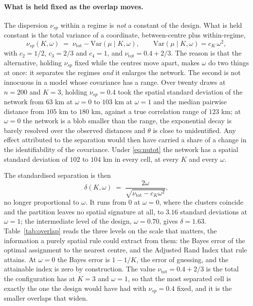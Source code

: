 \paragraph{What is held fixed as the overlap moves.} The dispersion $\nu_{sp}$ within a regime is \emph{not} a constant of the design. What is held constant is the total variance of a coordinate, between-centre plus within-regime,
\begin{equation}
  \nu_{sp}(K,\omega) \;=\; \nu_{\mathrm{tot}} - \mathrm{Var}(\mu \mid K, \omega),
  \qquad
  \mathrm{Var}(\mu \mid K, \omega) = c_K\,\omega^2 ,
  \label{eq:nutot}
\end{equation}
with $c_2 = 1/2$, $c_3 = 2/3$ and $c_4 = 1$, and $\nu_{\mathrm{tot}} = 0.4 + 2/3$. The reason is that the alternative, holding $\nu_{sp}$ fixed while the centres move apart, makes $\omega$ do two things at once: it separates the regimes \emph{and} it enlarges the network. The second is not innocuous in a model whose covariance has a range. Over twenty draws at $n=200$ and $K=3$, holding $\nu_{sp}=0.4$ took the spatial standard deviation of the network from $63$ km at $\omega=0$ to $103$ km at $\omega=1$ and the median pairwise distance from $105$ km to $180$ km, against a true correlation range of $123$ km; at $\omega=0$ the network is a blob smaller than the range, the exponential decay is barely resolved over the observed distances and $\theta$ is close to unidentified. Any effect attributed to the separation would then have carried a share of a change in the identifiability of the covariance. Under \eqref{eq:nutot} the network has a spatial standard deviation of $102$ to $104$ km in every cell, at every $K$ and every $\omega$.

The standardised separation is then
\begin{equation}
  \delta(K,\omega) \;=\; \frac{2\omega}{\sqrt{\nu_{\mathrm{tot}} - c_K \omega^2}} ,
  \label{eq:sep}
\end{equation}
no longer proportional to $\omega$. It runs from $0$ at $\omega=0$, where the clusters coincide and the partition leaves no spatial signature at all, to $3.16$ standard deviations at $\omega=1$; the intermediate level of the design, $\omega = 0.70$, gives $\delta = 1.63$. Table~\ref{tab:overlap} reads the three levels on the scale that matters, the information a purely spatial rule could extract from them: the Bayes error of the optimal assignment to the nearest centre, and the Adjusted Rand Index that rule attains. At $\omega = 0$ the Bayes error is $1 - 1/K$, the error of guessing, and the attainable index is zero by construction. The value $\nu_{\mathrm{tot}} = 0.4 + 2/3$ is the total the configuration has at $K=3$ and $\omega=1$, so that the most separated cell is exactly the one the design would have had with $\nu_{sp} = 0.4$ fixed, and it is the smaller overlaps that widen.

